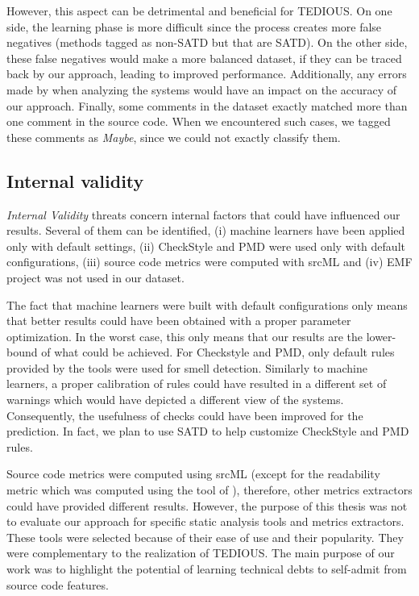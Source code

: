 However, this aspect can be detrimental and beneficial for TEDIOUS. On one side, the learning phase is more difficult since the process creates more false negatives (methods tagged as non-SATD but that are SATD). On the other side, these false negatives would make a more balanced dataset, if they can be traced back by our approach, leading to improved performance. Additionally, any errors made by \citet{maldonado17} when analyzing the systems would have an impact on the accuracy of our approach. Finally, some comments in the dataset exactly matched more than one comment in the source code. When we encountered such cases, we tagged these comments as \textit{Maybe}, since we could not exactly classify them.

\subsection{Internal validity}


\textit{Internal Validity} threats concern internal factors that could have influenced our results. Several of them can be identified, (i) machine learners have been applied only with default settings, (ii) CheckStyle and PMD were used only with default configurations, (iii) source code metrics were computed with srcML and (iv) \textsc{EMF} project was not used in our dataset.

The fact that machine learners were built with default configurations only means that better results could have been obtained with a proper parameter optimization. In the worst case, this only means that our results are the lower-bound of what could be achieved. For Checkstyle and PMD, only default rules provided by the tools were used for smell detection. Similarly to machine learners, a proper calibration of rules could have resulted in a different set of warnings which would have depicted a different view of the systems. Consequently, the usefulness of checks could have been improved for the prediction. In fact, we plan to use SATD to help customize CheckStyle and PMD rules.

Source code metrics were computed using srcML \citep{Collard2013} (except for the readability metric which was computed using the tool of \citet{buse2008metric}), therefore, other metrics extractors could have provided different results. However, the purpose of this thesis was not to evaluate our approach for specific static analysis tools and metrics extractors. These tools were selected because of their ease of use and their popularity. They were complementary to the realization of TEDIOUS. The main purpose of our work was to highlight the potential of learning technical debts to self-admit from source code features.


